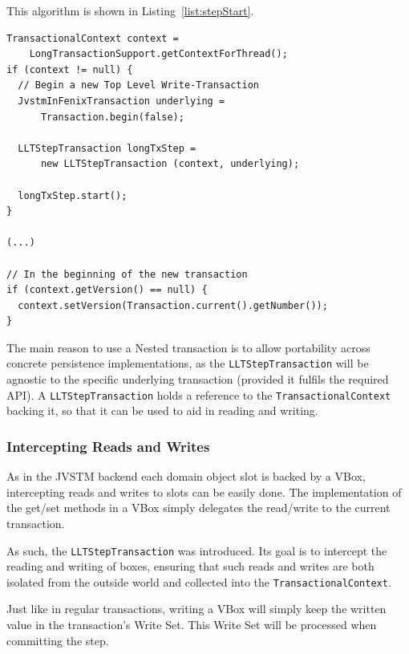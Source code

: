 This algorithm is shown in Listing~\ref{list:stepStart}.

\begin{lstlisting}[caption={Beginning a new Long Lived Transaction
    step}, label={list:stepStart}, float]
TransactionalContext context = 
    LongTransactionSupport.getContextForThread();
if (context != null) {
  // Begin a new Top Level Write-Transaction
  JvstmInFenixTransaction underlying =
      Transaction.begin(false);

  LLTStepTransaction longTxStep = 
      new LLTStepTransaction (context, underlying);

  longTxStep.start();
}

(...)

// In the beginning of the new transaction
if (context.getVersion() == null) {
  context.setVersion(Transaction.current().getNumber());
}
\end{lstlisting}

The main reason to use a Nested transaction is to allow portability
across concrete persistence implementations, as the
\texttt{LLTStepTransaction} will be agnostic to the specific
underlying transaction (provided it fulfils the required API). A
\texttt{LLTStepTransaction} holds a reference to the
\texttt{TransactionalContext} backing it, so that it can be used to
aid in reading and writing.

\subsubsection{Intercepting Reads and Writes}

As in the JVSTM backend each domain object slot is backed by a VBox,
intercepting reads and writes to slots can be easily done. The
implementation of the get/set methods in a VBox simply delegates the
read/write to the current transaction.

As such, the \texttt{LLTStepTransaction} was introduced. Its goal is
to intercept the reading and writing of boxes, ensuring that such
reads and writes are both isolated from the outside world and
collected into the \texttt{TransactionalContext}.

Just like in regular transactions, writing a VBox will simply keep the
written value in the transaction's Write Set. This Write Set will be
processed when committing the step. 

